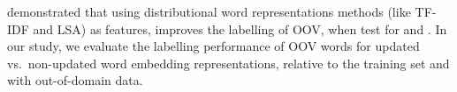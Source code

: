  demonstrated that using distributional word representations methods (like TF-IDF and LSA) as features, improves the labelling of OOV, when test for \pos and \chunking. In our study, we evaluate the labelling performance of OOV words for updated vs.\ non-updated word embedding representations, relative to the training set and with out-of-domain data.








